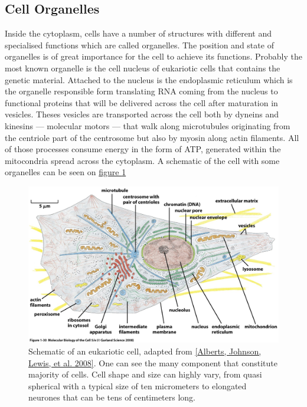 \documentclass[A4paperpaper,11pt,english]{sphinxmanual}
\begin{document}
\subsection{Cell Organelles}
\label{parts/part1:cell-organelles}
Inside the cytoplasm, cells have a number of structures with different and
specialised functions which are called organelles. The position and state of
organelles is of great importance for the cell to achieve its functions.
Probably the most known organelle is the cell nucleus of eukariotic cells that
contains the genetic material. Attached to the nucleus is the endoplasmic
reticulum  which is the organelle responsible form translating
RNA coming from the nucleus to functional proteins that will be delivered
across the cell after maturation in vesicles. Theses vesicles are
transported across the cell both by dyneins and kinesins — molecular motors —
that walk along microtubules originating from the centriole part of the
centrosome but also by myosin along actin filaments.  All of those processes
consume energy in  the form of ATP, generated within the mitocondria spread
across the cytoplasm. A schematic of the cell with some organelles can be seen
on \hyperref[parts/part1:albertcell]{figure  \ref*{parts/part1:albertcell}}
\begin{figure}[htbp]
\centering
\capstart

\includegraphics[width=0.900\linewidth]{figure-1-30.jpg}
\caption{Schematic of an eukariotic cell, adapted from {\hyperref[parts/part1:alberts2008]{{[}Alberts, Johnson, Lewis,  et al.  2008{]}}}. One can
see the many component that constitute majority of cells.  Cell shape and
size can highly vary, from quasi spherical with a typical size of ten
micrometers to elongated neurones that can be tens of centimeters long.}\label{parts/part1:albertcell}\end{figure}
\end{document}
